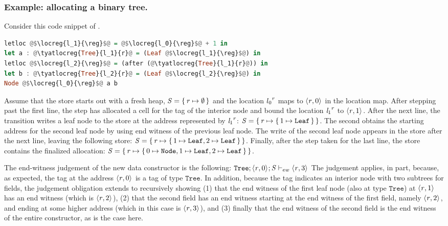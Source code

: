 \documentclass[showabstract,showacknowledgments,showpreface,showdedication]{iuphd}
\begin{document}
\subsubsection{Example: allocating a binary tree.}
\label{sec:dynsem-example}
%
Consider this code snippet of \ourcalc{}.
%
\begin{lstlisting}[language=Haskell]
letloc @$\locreg{l_1}{\reg}$@ = @$\locreg{l_0}{\reg}$@ + 1 in
let a : @\tyatlocreg{Tree}{l_1}{r}@ = (Leaf @$\locreg{l_1}{\reg}$@) in
letloc @$\locreg{l_2}{\reg}$@ = (after (@\tyatlocreg{Tree}{l_1}{r}@)) in
let b : @\tyatlocreg{Tree}{l_2}{r}@ = (Leaf @$\locreg{l_2}{\reg}$@) in
Node @$\locreg{l_0}{\reg}$@ a b
\end{lstlisting}
%
Assume that the store starts out with a fresh heap, $\mathit{S} = \{ \, \mathit{r}
  \mapsto \emptyset \,\}$ and the location ${l_0}^{\mathit{r}}$ maps to
$\langle \mathit{r}, 0 \rangle ^{}$ in the location map.
%
After stepping past the first line, the \textsc{\dletloctag{}} step has
allocated a cell for the tag of the interior node and bound the
location ${\mathit{l}_1}^{\mathit{r}}$ to $\langle \mathit{r}, 1 \rangle ^{}$.
%
After the next line, the \textsc{\ddatacon{}} transition writes a leaf node to
the store at the address represented by ${\mathit{l}_1}^{\mathit{r}}$:
$\mathit{S} = \{ \, \mathit{r} \mapsto \{ \, 1 \mapsto \mathtt{Leaf} \,\} \,\}$.
%
The second  obtains the starting address for the second
leaf node by using end witness of the previous leaf node.
%
The write of the second leaf node appears in the store after
the next line, leaving the following store:
$
\mathit{S} = \{ \, \mathit{r} \mapsto \{ \, 1 \mapsto \mathtt{Leaf}, 2 \mapsto \mathtt{Leaf} \,\} \,\}$.
%
Finally, after the \textsc{\ddatacon{}} step taken for the last line, the store
contains the finalized allocation:
$\mathit{S} = \{ \, \mathit{r} \mapsto \{ \, 0 \mapsto \mathtt{Node}, 1 \mapsto \mathtt{Leaf}, 2 \mapsto \mathtt{Leaf} \,\} \,\}$.
%

The end-witness judgement of the new data constructor is the
following:
$\mathtt{Tree};\langle \mathit{r}, 0 \rangle ^{};\mathit{S} \vdash_{ew} \langle \mathit{r}, 3 \rangle ^{}$
%
The judgement applies, in part, because, as expected, the tag at the
address $\langle \mathit{r}, 0 \rangle ^{}$ is a tag of type $\mathtt{Tree}$.
%
In addition, because the tag indicates an interior node with two
subtrees for fields, the judgement obligation extends to recursively
showing (1) that the end witness of the first leaf node (also at type
$\mathtt{Tree}$) at $\langle \mathit{r}, 1 \rangle ^{}$ has an end witness
(which is $\langle \mathit{r}, 2 \rangle ^{}$), (2) that the second field has an
end witness starting at the end witness of the first field, namely
$\langle \mathit{r}, 2 \rangle ^{}$, and ending at some higher address (which in
this case is $\langle \mathit{r}, 3 \rangle ^{}$), and (3) finally that the end
witness of the second field is the end witness of the entire
constructor, as is the case here.
\end{document}
